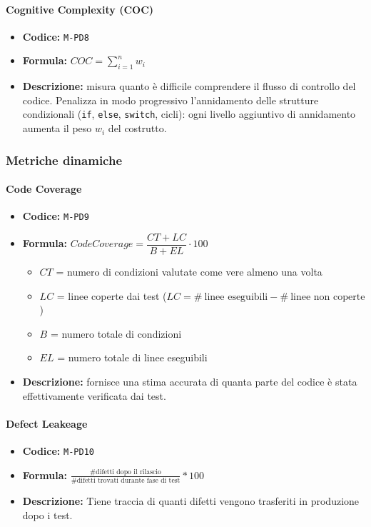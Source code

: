 \documentclass[a4paper,12pt]{article}
\begin{document}
\paragraph{Cognitive Complexity (COC)}
\begin{itemize}
\item \textbf{Codice:} \texttt{M-PD8}
\item \textbf{Formula:} $COC = \sum_{i=1}^{n} w_i$
\item \textbf{Descrizione:} misura quanto è difficile comprendere il flusso di controllo 
del codice. Penalizza in modo progressivo l'annidamento delle strutture condizionali 
(\texttt{if}, \texttt{else}, \texttt{switch}, cicli): ogni livello aggiuntivo di annidamento aumenta il peso $w_i$ del costrutto.
\end{itemize}

\subsubsection{Metriche dinamiche}
\paragraph{Code Coverage}
\begin{itemize}
\item \textbf{Codice:} \texttt{M-PD9}
\item \textbf{Formula:} 
$Code Coverage = \dfrac{CT + LC}{B + EL} \cdot 100$
\begin{itemize}
    \item \textbf{$CT$} = numero di condizioni valutate come vere almeno una volta
    \item \textbf{$LC$} = linee coperte dai test 
    ($LC = \#\ \text{linee eseguibili} - \#\ \text{linee non coperte}$)
    \item \textbf{$B$} = numero totale di condizioni
    \item \textbf{$EL$} = numero totale di linee eseguibili
\end{itemize}
\item \textbf{Descrizione:} fornisce una stima accurata di quanta parte 
del codice è stata effettivamente verificata dai test.
\end{itemize}

\paragraph{Defect Leakeage}
\begin{itemize}
    \item \textbf{Codice:} \texttt{M-PD10}
    \item \textbf{Formula:} $\frac{\text{\# difetti dopo il rilascio}}{\text{\# difetti trovati durante fase di test}}*100$
    \item \textbf{Descrizione:} Tiene traccia di quanti difetti vengono trasferiti in produzione dopo i test.
\end{itemize}
\end{document}

